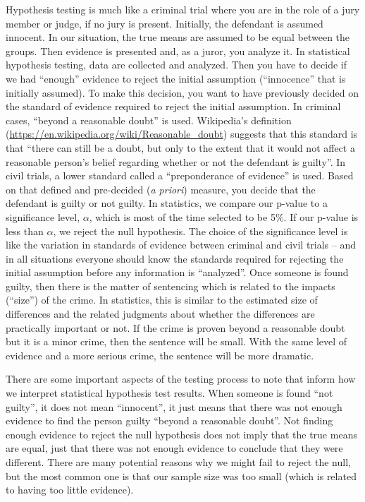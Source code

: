 \documentclass[]{book}
\theoremstyle{definition}
\theoremstyle{definition}
\theoremstyle{remark}
\begin{document}
Hypothesis testing is much like a criminal trial where you are in the
role of a jury member or judge, if no jury is present. Initially, the
defendant is assumed innocent. In our situation, the true means are
assumed to be equal between the groups. Then evidence is presented and,
as a juror, you analyze it. In statistical hypothesis testing, data are
collected and analyzed. Then you have to decide if we had ``enough''
evidence to reject the initial assumption (``innocence'' that is
initially assumed). To make this decision, you want to have previously
decided on the standard of evidence required to reject the initial
assumption. In criminal cases, ``beyond a reasonable doubt'' is used.
Wikipedia's definition
(\url{https://en.wikipedia.org/wiki/Reasonable_doubt}) suggests that
this standard is that ``there can still be a doubt, but only to the
extent that it would not affect a reasonable person's belief regarding
whether or not the defendant is guilty''. In civil trials, a lower
standard called a ``preponderance of evidence'' is used. Based on that
defined and pre-decided (\emph{a priori}) measure, you decide that the
defendant is guilty or not guilty. In statistics, we compare our p-value
to a significance level, \(\alpha\), which is most of the time selected
to be 5\%. If our p-value is less than \(\alpha\), we reject the null
hypothesis. The choice of the significance level is like the variation
in standards of evidence between criminal and civil trials -- and in all
situations everyone should know the standards required for rejecting the
initial assumption before any information is ``analyzed''. Once someone
is found guilty, then there is the matter of sentencing which is related
to the impacts (``size'') of the crime. In statistics, this is similar
to the estimated size of differences and the related judgments about
whether the differences are practically important or not. If the crime
is proven beyond a reasonable doubt but it is a minor crime, then the
sentence will be small. With the same level of evidence and a more
serious crime, the sentence will be more dramatic.

There are some important aspects of the testing process to note that
inform how we interpret statistical hypothesis test results. When
someone is found ``not guilty'', it does not mean ``innocent'', it just
means that there was not enough evidence to find the person guilty
``beyond a reasonable doubt''. Not finding enough evidence to reject the
null hypothesis does not imply that the true means are equal, just that
there was not enough evidence to conclude that they were different.
There are many potential reasons why we might fail to reject the null,
but the most common one is that our sample size was too small (which is
related to having too little evidence).
\end{document}
